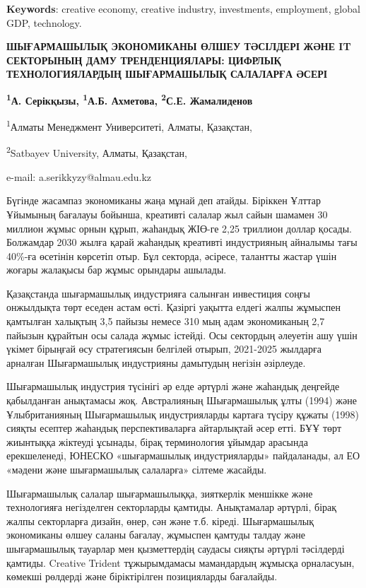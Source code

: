 {\bfseries Keywords}: creative economy, creative industry, investments,
employment, global GDP, technology.

\begin{center}
{\large\bfseries ШЫҒАРМАШЫЛЫҚ ЭКОНОМИКАНЫ ӨЛШЕУ ТӘСІЛДЕРІ ЖӘНЕ IT СЕКТОРЫНЫҢ ДАМУ
ТРЕНДЕНЦИЯЛАРЫ: ЦИФРЛЫҚ ТЕХНОЛОГИЯЛАРДЫҢ ШЫҒАРМАШЫЛЫҚ САЛАЛАРҒА ӘСЕРІ}

{\bfseries \textsuperscript{1}А. Серікқызы\envelope, \textsuperscript{1}А.Б. Ахметова, \textsuperscript{2}С.Е. Жамалиденов}

\textsuperscript{1}Алматы Менеджмент Университеті, Алматы, Қазақстан,

\textsuperscript{2}Satbayev University, Алматы, Қазақстан,

e-mail: a.serikkyzy@almau.edu.kz
\end{center}

Бүгінде жасампаз экономиканы жаңа мұнай деп атайды. Біріккен Ұлттар
Ұйымының бағалауы бойынша, креативті салалар жыл сайын шамамен 30
миллион жұмыс орнын құрып, жаһандық ЖІӨ-ге 2,25 триллион доллар қосады.
Болжамдар 2030 жылға қарай жаһандық креативті индустрияның айналымы тағы
40\%-ға өсетінін көрсетіп отыр. Бұл секторда, әсіресе, талантты жастар
үшін жоғары жалақысы бар жұмыс орындары ашылады.

Қазақстанда шығармашылық индустрияға салынған инвестиция соңғы
онжылдықта төрт еседен астам өсті. Қазіргі уақытта елдегі жалпы жұмыспен
қамтылған халықтың 3,5 пайызы немесе 310 мың адам экономиканың 2,7
пайызын құрайтын осы салада жұмыс істейді. Осы сектордың әлеуетін ашу
үшін үкімет бірыңғай өсу стратегиясын белгілей отырып, 2021-2025
жылдарға арналған Шығармашылық индустрияны дамытудың негізін әзірлеуде.

Шығармашылық индустрия түсінігі әр елде әртүрлі және жаһандық деңгейде
қабылданған анықтамасы жоқ. Австралияның Шығармашылық ұлты (1994) және
Ұлыбританияның Шығармашылық индустрияларды картаға түсіру құжаты (1998)
сияқты есептер жаһандық перспективаларға айтарлықтай әсер етті. БҰҰ төрт
жиынтыққа жіктеуді ұсынады, бірақ терминология ұйымдар арасында
ерекшеленеді, ЮНЕСКО «шығармашылық индустрияларды» пайдаланады, ал ЕО
«мәдени және шығармашылық салаларға» сілтеме жасайды.

Шығармашылық салалар шығармашылыққа, зияткерлік меншікке және
технологияға негізделген секторларды қамтиды. Анықтамалар әртүрлі, бірақ
жалпы секторларға дизайн, өнер, сән және т.б. кіреді. Шығармашылық
экономиканы өлшеу саланы бағалау, жұмыспен қамтуды талдау және
шығармашылық тауарлар мен қызметтердің саудасы сияқты әртүрлі тәсілдерді
қамтиды. Creative Trident тұжырымдамасы мамандардың жұмысқа орналасуын,
көмекші рөлдерді және біріктірілген позицияларды бағалайды.

